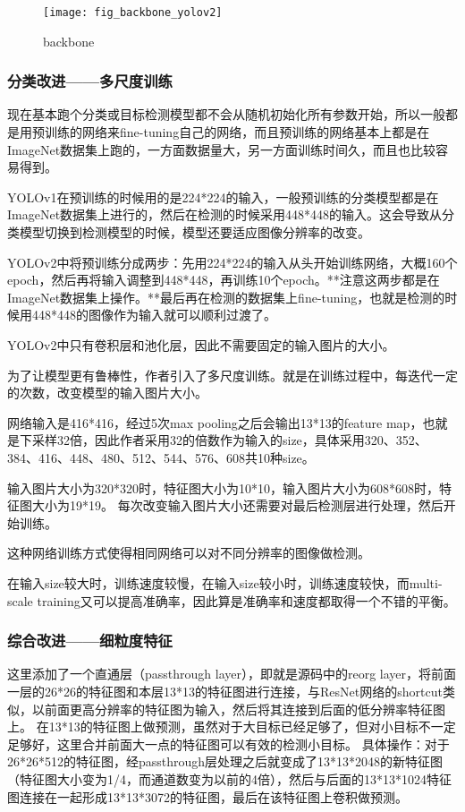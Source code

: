 \documentclass[a4paper, notitlepage]{article}
\begin{document}
\begin{figure}[H]
    \centering
    \texttt{[image: fig\_backbone\_yolov2]}
    \caption{backbone}
    \label{fig:example}
\end{figure}

\subsubsection{分类改进——多尺度训练}
现在基本跑个分类或目标检测模型都不会从随机初始化所有参数开始，所以一般都是用预训练的网络来fine-tuning自己的网络，而且预训练的网络基本上都是在ImageNet数据集上跑的，一方面数据量大，另一方面训练时间久，而且也比较容易得到。

YOLOv1在预训练的时候用的是224*224的输入，一般预训练的分类模型都是在ImageNet数据集上进行的，然后在检测的时候采用448*448的输入。这会导致从分类模型切换到检测模型的时候，模型还要适应图像分辨率的改变。

YOLOv2中将预训练分成两步：先用224*224的输入从头开始训练网络，大概160个epoch，然后再将输入调整到448*448，再训练10个epoch。**注意这两步都是在ImageNet数据集上操作。**最后再在检测的数据集上fine-tuning，也就是检测的时候用448*448的图像作为输入就可以顺利过渡了。

YOLOv2中只有卷积层和池化层，因此不需要固定的输入图片的大小。

为了让模型更有鲁棒性，作者引入了多尺度训练。就是在训练过程中，每迭代一定的次数，改变模型的输入图片大小。

网络输入是416*416，经过5次max pooling之后会输出13*13的feature map，也就是下采样32倍，因此作者采用32的倍数作为输入的size，具体采用320、352、384、416、448、480、512、544、576、608共10种size。

输入图片大小为320*320时，特征图大小为10*10，输入图片大小为608*608时，特征图大小为19*19。
每次改变输入图片大小还需要对最后检测层进行处理，然后开始训练。

这种网络训练方式使得相同网络可以对不同分辨率的图像做检测。

在输入size较大时，训练速度较慢，在输入size较小时，训练速度较快，而multi-scale training又可以提高准确率，因此算是准确率和速度都取得一个不错的平衡。

\subsubsection{综合改进——细粒度特征}

这里添加了一个直通层（passthrough layer），即就是源码中的reorg layer，将前面一层的26*26的特征图和本层13*13的特征图进行连接，与ResNet网络的shortcut类似，以前面更高分辨率的特征图为输入，然后将其连接到后面的低分辨率特征图上。
在13*13的特征图上做预测，虽然对于大目标已经足够了，但对小目标不一定足够好，这里合并前面大一点的特征图可以有效的检测小目标。
具体操作：对于26*26*512的特征图，经passthrough层处理之后就变成了13*13*2048的新特征图（特征图大小变为1/4，而通道数变为以前的4倍），然后与后面的13*13*1024特征图连接在一起形成13*13*3072的特征图，最后在该特征图上卷积做预测。
\end{document}
